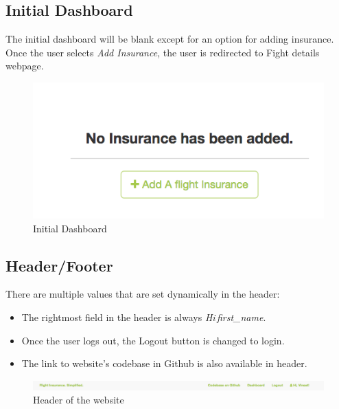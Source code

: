 \subsection{Initial Dashboard}
The initial dashboard will be blank except for an option for adding insurance.
Once the user selects \textit{Add Insurance}, the user is redirected to Fight details webpage.
\begin{figure}[H]
    \centering
    \includegraphics[width=\textwidth]{Figures/init_dashboard.png}
    \caption{Initial Dashboard}
    \label{fig:init_dash}
\end{figure}


\subsection{Header/Footer}
There are multiple values that are set dynamically in the header:

\begin{itemize}
    \item The rightmost field in the header is always \textit{Hi\,first\_name}.
    \item Once the user logs out, the Logout button is changed to login.
    \item The link to website's codebase in Github is also available in header.
\end{itemize}

\begin{figure}[h]
    \centering
    \includegraphics[width=\textwidth]{Figures/header.png}
    \caption{Header of the website}
    \label{fig:header}
\end{figure}


